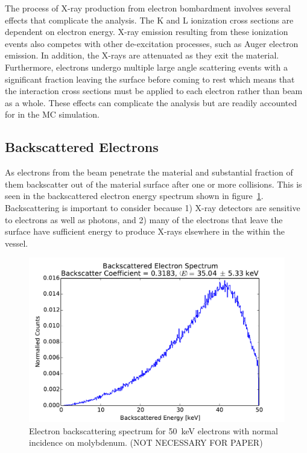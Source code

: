 \documentclass[12pt,letterpaper,final]{article}
\begin{document}
The process of X-ray production from electron bombardment involves several effects that complicate the analysis. The K and L ionization cross sections are dependent on electron energy. X-ray emission resulting from these ionization events also competes with other de-excitation processes, such as Auger electron emission. In addition, the X-rays are attenuated as they exit the material. Furthermore, electrons undergo multiple large angle scattering events with a significant fraction leaving the surface before coming to rest which means that the interaction cross sections must be applied to each electron rather than beam as a whole. These effects can complicate the analysis but are readily accounted for in the MC simulation.%

\subsection{Backscattered Electrons}

As electrons from the beam penetrate the material and substantial fraction of them backscatter out of the material surface after one or more collisions.  This is seen in the backscattered electron energy spectrum shown in figure~\ref{fig:BackscatteringSpectrum}. Backscattering is important to consider because 1) X-ray detectors are sensitive to electrons as well as photons, and 2) many of the electrons that leave the surface have sufficient energy to produce X-rays elsewhere in the within the vessel.

\begin{figure}[!h]
 \centering
  \includegraphics[width=\columnwidth]{figures/MolybdenumBackscatteringSpectrum.pdf}
 \caption{Electron backscattering spectrum for 50~keV electrons with normal incidence on molybdenum. (NOT NECESSARY FOR PAPER)} 
 \label{fig:BackscatteringSpectrum}
\end{figure}
\end{document}
